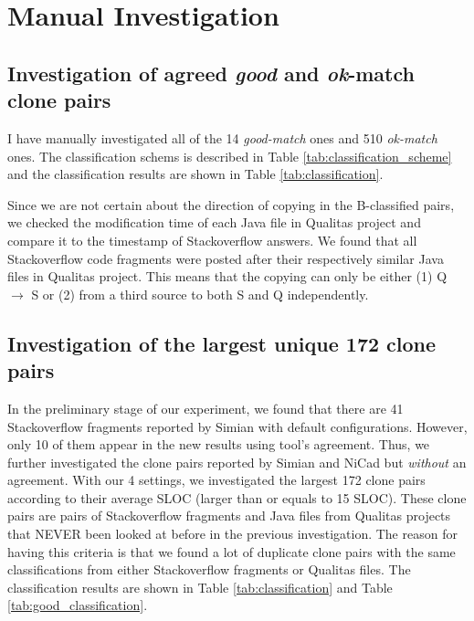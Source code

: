 \documentclass{IEEEtran}
\begin{document}
\section*{Manual Investigation}

\subsection{Investigation of agreed \textit{good} and \textit{ok}-match clone pairs}
I have manually investigated all of the 14 \textit{good-match} ones and 510 \textit{ok-match} ones. The classification schems is described in Table \ref{tab:classification_scheme} and the classification results are shown in Table \ref{tab:classification}. 

Since we are not certain about the direction of copying in the B-classified pairs, we checked the modification time of each Java file in Qualitas project and compare it to the timestamp of Stackoverflow answers. We found that all Stackoverflow code fragments were posted after their respectively similar Java files in Qualitas project. This means that the copying can only be either (1) Q $\rightarrow$ S or (2) from a third source to both S and Q independently.

\subsection{Investigation of the largest unique 172 clone pairs}
In the preliminary stage of our experiment, we found that there are 41 Stackoverflow fragments reported by Simian with default configurations. However, only 10 of them appear in the new results using tool's agreement. Thus, we further investigated the clone pairs reported by Simian and NiCad but \textit{without} an agreement. With our 4 settings, we investigated the largest 172 clone pairs according to their average SLOC (larger than or equals to 15 SLOC). These clone pairs are pairs of Stackoverflow fragments and Java files from Qualitas projects that NEVER been looked at before in the previous investigation. The reason for having this criteria is that we found a lot of duplicate clone pairs with the same classifications from either Stackoverflow fragments or Qualitas files. The classification results are shown in Table \ref{tab:classification} and Table \ref{tab:good_classification}.
\end{document}
